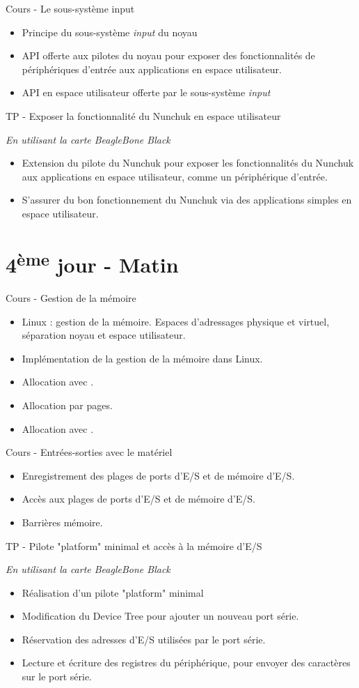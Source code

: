 \documentclass[a4paper,12pt,obeyspaces,spaces,hyphens]{article}
\begin{document}
\feagendatwocolumn
{Cours - Le sous-système input}
{
  \begin{itemize}
  \item Principe du sous-système {\em input} du noyau
  \item API offerte aux pilotes du noyau pour exposer
    des fonctionnalités de périphériques d'entrée aux
    applications en espace utilisateur.
  \item API en espace utilisateur offerte par le
    sous-système {\em input}
  \end{itemize}
}
{TP - Exposer la fonctionnalité du Nunchuk en espace utilisateur}
{
  {\em En utilisant la carte BeagleBone Black}
  \begin{itemize}
  \item Extension du pilote du Nunchuk pour exposer les fonctionnalités
    du Nunchuk aux applications en espace utilisateur, comme
    un périphérique d'entrée.
  \item S'assurer du bon fonctionnement du Nunchuk via
    des applications simples en espace utilisateur.
  \end{itemize}
}

\section{4\textsuperscript{ème} jour - Matin}

\feagendatwocolumn
{Cours - Gestion de la mémoire}
{
  \begin{itemize}
  \item Linux : gestion de la mémoire. Espaces d'adressages physique et
     virtuel, séparation noyau et espace utilisateur.
  \item Implémentation de la gestion de la mémoire dans Linux.
  \item Allocation avec .
  \item Allocation par pages.
  \item Allocation avec .
  \end{itemize}
}
{Cours - Entrées-sorties avec le matériel}
{
  \begin{itemize}
  \item Enregistrement des plages de ports d'E/S et de mémoire d'E/S.
  \item Accès aux plages de ports d'E/S et de mémoire d'E/S.
  \item Barrières mémoire.
  \end{itemize}
}

\feagendaonecolumn
{TP - Pilote "platform" minimal et accès à la mémoire d'E/S}
{
  {\em En utilisant la carte BeagleBone Black}
  \begin{itemize}
  \item Réalisation d'un pilote "platform" minimal
  \item Modification du Device Tree pour ajouter un nouveau
    port série.
  \item Réservation des adresses d'E/S utilisées par le port série.
  \item Lecture et écriture des registres du périphérique, pour
    envoyer des caractères sur le port série.
  \end{itemize}
}
\end{document}
